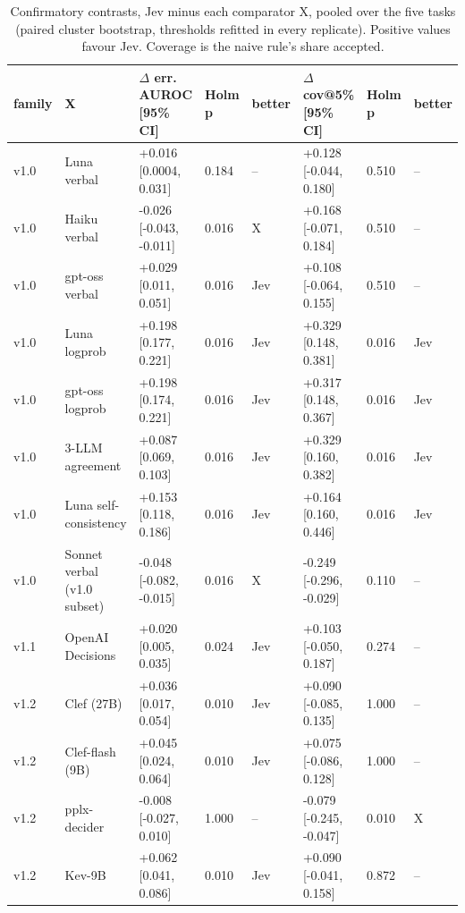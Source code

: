 \begin{table}[t]
\centering
\small
\caption{Confirmatory contrasts, Jev minus each comparator X, pooled over the five tasks (paired cluster bootstrap, thresholds refitted in every replicate). Positive values favour Jev. Coverage is the naive rule's share accepted.}
\label{tab:main_claims}
\begin{adjustbox}{max width=\linewidth}
\begin{tabular}{llllllll}
\toprule
family & X & \makecell[bl]{$\Delta$ err. AUROC \\{} [95\% CI]} & Holm p & better & \makecell[bl]{$\Delta$ cov@5\% [95\% \\{} CI]} & Holm p & better \\
\midrule
v1.0 & Luna verbal & +0.016 [0.0004, 0.031] & 0.184 & -- & +0.128 [-0.044, 0.180] & 0.510 & -- \\
v1.0 & Haiku verbal & -0.026 [-0.043, -0.011] & 0.016 & X & +0.168 [-0.071, 0.184] & 0.510 & -- \\
v1.0 & gpt-oss verbal & +0.029 [0.011, 0.051] & 0.016 & Jev & +0.108 [-0.064, 0.155] & 0.510 & -- \\
v1.0 & Luna logprob & +0.198 [0.177, 0.221] & 0.016 & Jev & +0.329 [0.148, 0.381] & 0.016 & Jev \\
v1.0 & gpt-oss logprob & +0.198 [0.174, 0.221] & 0.016 & Jev & +0.317 [0.148, 0.367] & 0.016 & Jev \\
v1.0 & 3-LLM agreement & +0.087 [0.069, 0.103] & 0.016 & Jev & +0.329 [0.160, 0.382] & 0.016 & Jev \\
v1.0 & Luna self-consistency & +0.153 [0.118, 0.186] & 0.016 & Jev & +0.164 [0.160, 0.446] & 0.016 & Jev \\
v1.0 & Sonnet verbal (v1.0 subset) & -0.048 [-0.082, -0.015] & 0.016 & X & -0.249 [-0.296, -0.029] & 0.110 & -- \\
\midrule
v1.1 & OpenAI Decisions & +0.020 [0.005, 0.035] & 0.024 & Jev & +0.103 [-0.050, 0.187] & 0.274 & -- \\
\midrule
v1.2 & Clef (27B) & +0.036 [0.017, 0.054] & 0.010 & Jev & +0.090 [-0.085, 0.135] & 1.000 & -- \\
v1.2 & Clef-flash (9B) & +0.045 [0.024, 0.064] & 0.010 & Jev & +0.075 [-0.086, 0.128] & 1.000 & -- \\
v1.2 & pplx-decider & -0.008 [-0.027, 0.010] & 1.000 & -- & -0.079 [-0.245, -0.047] & 0.010 & X \\
v1.2 & Kev-9B & +0.062 [0.041, 0.086] & 0.010 & Jev & +0.090 [-0.041, 0.158] & 0.872 & -- \\

\end{tabular}
\end{adjustbox}
\end{table}
